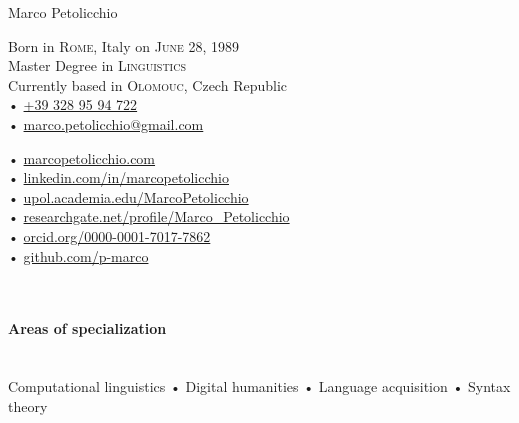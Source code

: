 \documentclass[9pt, a4paper]{article}
\begin{document}
\reversemarginpar
{{\huge Marco Petolicchio}\\[1.2cm]
\parbox{.5\linewidth}{

Born in \textsc{Rome}, Italy on \textsc{June 28, 1989} \\
Master Degree in \textsc{Linguistics}\\
Currently based in \textsc{Olomouc}, Czech Republic \\[.4cm]
• \href{tel:+393289594722}{+39 328 95 94 722}\\
• \href{mailto:marco.petolicchio@gmail.com}{marco.petolicchio@gmail.com}
}
\parbox{.5\linewidth}{
• \href{http://marcopetolicchio.com}{marcopetolicchio.com}\\
• \href{http://www.linkedin.com/in/marcopetolicchio/}{linkedin.com/in/marcopetolicchio}\\
• \href{http://upol.academia.edu/MarcoPetolicchio}{upol.academia.edu/MarcoPetolicchio}\\
• \href{https://www.researchgate.net/profile/Marco_Petolicchio}{researchgate.net/profile/Marco\_Petolicchio}\\
• \href{http://orcid.org/0000-0001-7017-7862}{orcid.org/0000-0001-7017-7862}\\
• \href{http://github.com/p-marco/}{github.com/p-marco}\\
}\\[.4cm]



\paragraph{Areas of specialization} \hfill \\%
Computational linguistics • Digital humanities • Language acquisition • Syntax theory 



}
\end{document}

